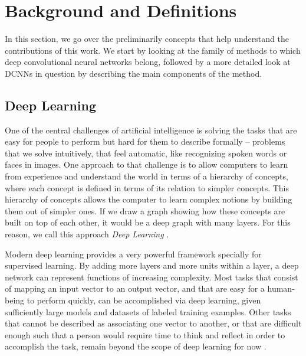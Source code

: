 \chapter{Background and Definitions}
\label{sec:Background}
In this section, we go over the preliminarily concepts that help understand the contributions of this work. We start by looking at the family of methods to which deep convolutional neural networks belong, followed by a more detailed look at DCNNs in question by describing the main components of the method.

\section{Deep Learning}
\label{sec:dl}
One of the central challenges of artificial intelligence is solving the tasks that are easy for people to perform but hard for them to describe formally -- problems that we solve intuitively, that feel automatic, like recognizing spoken words or faces in images. One approach to that challenge is to allow computers to learn from experience and understand the world in terms of a hierarchy of concepts, where each concept is defined in terms of its relation to simpler concepts. This hierarchy of concepts allows the computer to learn complex notions by building them out of simpler ones. If we draw a graph showing how these concepts are built on top of each other, it would be a deep graph with many layers. For this reason, we call this approach \textit{Deep Learning} \cite{Goodfellow-et-al-2016-Book}.

Modern deep learning provides a very powerful framework specially for supervised learning. By adding more layers and more units within a layer, a deep network can represent functions of increasing complexity. Most tasks that consist of mapping an input vector to an output vector, and that are easy for a human-being to perform quickly, can be accomplished via deep learning, given sufficiently large models and datasets of labeled training examples. Other tasks that cannot be described as associating one vector to another, or that are difficult enough such that a person would require time to think and reflect in order to accomplish the task, remain beyond the scope of deep learning for now \cite{Goodfellow-et-al-2016-Book}.

